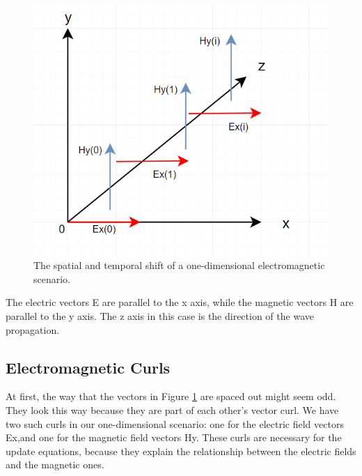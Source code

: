 \begin{figure}
	\centering
	\includegraphics[scale=0.7]{Figures/fdtd1dDiscretized}
	\decoRule
	\caption[1D Spatial and Temporal Shift - TE Mode]{The spatial and temporal shift of a one-dimensional electromagnetic scenario.}
	\label{fig:fdtd1dDiscretized}
\end{figure}

The electric vectors E are parallel to the x axis, while the magnetic vectors H are parallel to the y axis. The z axis in this case is the direction of the wave propagation.


\subsection{Electromagnetic Curls}

At first, the way that the vectors in Figure \ref{fig:fdtd1dDiscretized} are spaced out might seem odd. They look this way because they are part of each other's vector curl. We have two such curls in our one-dimensional scenario: one for the electric field vectors Ex,and one for the magnetic field vectors Hy. These curls are necessary for the update equations, because they explain the relationship between the electric fields and the magnetic ones.

